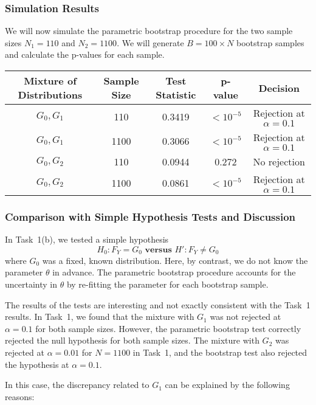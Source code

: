 \documentclass{article}
\begin{document}
\subsubsection{Simulation Results}

We will now simulate the parametric bootstrap procedure for the two sample sizes \(N_1 = 110\) and \(N_2 = 1100\). We will generate \(B = 100 \times N\) bootstrap samples and calculate the p-values for each sample.

\begin{table}[h]
\centering
\begin{tabular}{|c|c|c|c|c|}
\hline
\textbf{Mixture of Distributions} & \textbf{Sample Size} & \textbf{Test Statistic} & \textbf{p-value} & \textbf{Decision} \\ \hline
\(G_0, G_1\) & 110 & 0.3419 & \(< 10^{-5}\) & Rejection at \(\alpha=0.1\) \\ \hline
\(G_0, G_1\) & 1100 & 0.3066 & \(< 10^{-5}\) & Rejection at \(\alpha=0.1\) \\ \hline
\(G_0, G_2\) & 110 & 0.0944 & 0.272 & No rejection \\ \hline
\(G_0, G_2\) & 1100 & 0.0861 & \(< 10^{-5}\) & Rejection at \(\alpha=0.1\) \\ \hline
\end{tabular}
\end{table}

\subsubsection{Comparison with Simple Hypothesis Tests and Discussion}

In Task~1(b), we tested a simple hypothesis
\[
H_0: F_Y = G_0 \textbf{ versus } H': F_Y \neq G_0
\]
where \(G_0\) was a fixed, known distribution. Here, by contrast, we do not know the parameter \(\theta\) in advance. The parametric bootstrap procedure accounts for the uncertainty in \(\theta\) by re-fitting the parameter for each bootstrap sample.

The results of the tests are interesting and not exactly consistent with the Task~1 results. In Task~1, we found that the mixture with \(G_1\) was not rejected at \(\alpha=0.1\) for both sample sizes. However, the parametric bootstrap test correctly rejected the null hypothesis for both sample sizes. The mixture with \(G_2\) was rejected at \(\alpha=0.01\) for \(N=1100\) in Task~1, and the bootstrap test also rejected the hypothesis at \(\alpha=0.1\).

In this case, the discrepancy related to \(G_1\) can be explained by the following reasons:
\end{document}
